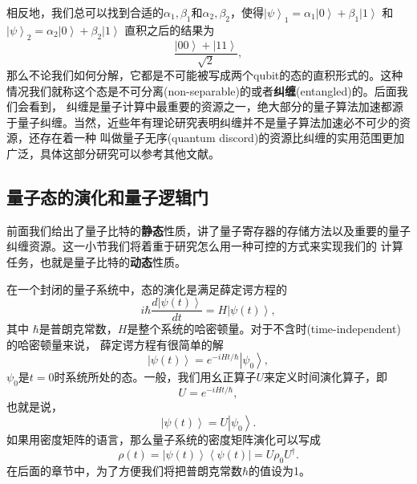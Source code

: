 相反地，我们总可以找到合适的$\alpha_1, \beta_1$和$\alpha_2, \beta_2$，使得$ \left\vert \psi \right\rangle_1= \alpha_1  \left\vert 0 \right\rangle + \beta_1  \left\vert 1 \right\rangle$ 和$ \left\vert \psi \right\rangle_2= \alpha_2  \left\vert 0 \right\rangle + \beta_2 \left\vert 1 \right\rangle$ 直积之后的结果为
 \begin{equation}
         \frac{\left\vert 00 \right\rangle+ \left\vert 11 \right\rangle}{\sqrt{2}},
 \end{equation}
 那么不论我们如何分解，它都是不可能被写成两个qubit的态的直积形式的。这种情况我们就称这个态是不可分离(non-separable)的或者\textbf{纠缠}(entangled)的。后面我们会看到，
 纠缠是量子计算中最重要的资源之一，绝大部分的量子算法加速都源于量子纠缠。当然，近些年有理论研究表明纠缠并不是量子算法加速必不可少的资源，还存在着一种
 叫做量子无序(quantum discord)的资源比纠缠的实用范围更加广泛，具体这部分研究可以参考其他文献。

 \subsection{量子态的演化和量子逻辑门}

 前面我们给出了量子比特的\textbf{静态}性质，讲了量子寄存器的存储方法以及重要的量子纠缠资源。这一小节我们将着重于研究怎么用一种可控的方式来实现我们的
 计算任务，也就是量子比特的\textbf{动态}性质。

 在一个封闭的量子系统中，态的演化是满足薛定谔方程的
  \begin{equation}
         i\hbar \frac{d\left\vert \psi(t)\right\rangle}{dt}=H\left\vert \psi(t)\right\rangle,
 \end{equation}
其中 $\hbar$是普朗克常数，$H$是整个系统的哈密顿量。对于不含时(time-independent)的哈密顿量来说，
薛定谔方程有很简单的解
   \begin{equation}
       \left\vert \psi(t)\right\rangle = e^{-iHt/\hbar} \left\vert \psi_0\right\rangle,
 \end{equation}
 $\psi_0$是$t=0$时系统所处的态。一般，我们用幺正算子$U$来定义时间演化算子，即
    \begin{equation}
       U = e^{-iHt/\hbar},
 \end{equation}
 也就是说，
   \begin{equation}
       \left\vert \psi(t)\right\rangle =U \left\vert \psi_0\right\rangle.
 \end{equation}
 如果用密度矩阵的语言，那么量子系统的密度矩阵演化可以写成
    \begin{equation}
       \rho(t) = \left\vert \psi(t)\right\rangle \left\langle \psi(t)\right\vert = U\rho_0 U^{\dagger}.
 \end{equation}
 在后面的章节中，为了方便我们将把普朗克常数$\hbar$的值设为1。

